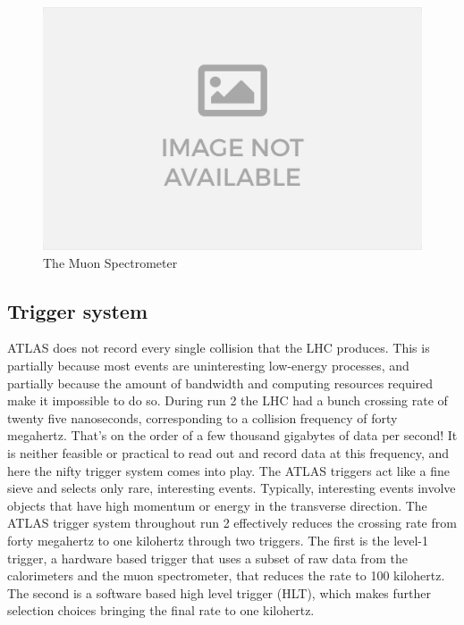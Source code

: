 \begin{figure}
    \centering
    \includegraphics[width=\smallfigwidth]{Figures/no-image.png}
    \caption{The Muon Spectrometer}
    \label{fig:muonspectrometer}
\end{figure}

\subsection{Trigger system}

ATLAS does not record every single collision that the LHC produces. This is partially because most events are uninteresting low-energy processes, and partially because the amount of bandwidth and computing resources required make it impossible to do so. During run 2 the LHC had a bunch crossing rate of twenty five nanoseconds, corresponding to a collision frequency of forty megahertz. That's on the order of a few thousand gigabytes of data per second! It is neither feasible or practical to read out and record data at this frequency, and here the nifty trigger system comes into play. The ATLAS triggers act like a fine sieve and selects only rare, interesting events. Typically, interesting events involve objects that have high momentum or energy in the transverse direction. The ATLAS trigger system throughout run 2 effectively reduces the crossing rate from forty megahertz to one kilohertz through two triggers. The first is the level-1 trigger, a hardware based trigger that uses a subset of raw data from the calorimeters and the muon spectrometer, that reduces the rate to 100 kilohertz. The second is a software based high level trigger (HLT), which makes further selection choices bringing the final rate to one kilohertz. 

